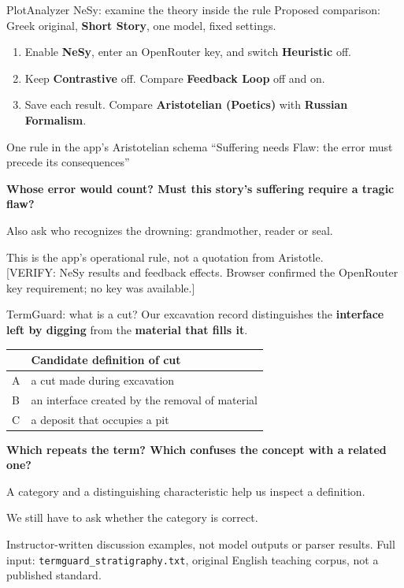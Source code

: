 \documentclass[aspectratio=169,10pt]{beamer}
\newcommand{\key}[1]{\textcolor{aegean}{\textbf{#1}}}
\newcommand{\source}[1]{\vfill{\scriptsize\color{slate}#1\par}}
\newcommand{\question}[1]{\medskip\par\key{#1}\par}
\begin{document}
\begin{frame}{PlotAnalyzer NeSy: examine the theory inside the rule}
  \small Proposed comparison: Greek original, \textbf{Short Story}, one model, fixed settings.
  \begin{enumerate}
    \item Enable \textbf{NeSy}, enter an OpenRouter key, and switch \textbf{Heuristic} off.
    \item Keep \textbf{Contrastive} off. Compare \textbf{Feedback Loop} off and on.
    \item Save each result. Compare \textbf{Aristotelian (Poetics)} with \textbf{Russian Formalism}.
  \end{enumerate}
  \begin{block}{One rule in the app's Aristotelian schema}
    “Suffering needs Flaw: the error must precede its consequences”
  \end{block}
  \question{Whose error would count? Must this story's suffering require a tragic flaw?}
  \small Also ask who recognizes the drowning: grandmother, reader or seal.
  \source{This is the app's operational rule, not a quotation from Aristotle.\\
  {}[VERIFY: NeSy results and feedback effects. Browser confirmed the OpenRouter key requirement; no key was available.]}
\end{frame}

\begin{frame}{TermGuard: what is a cut?}
  \small
  Our excavation record distinguishes the \key{interface left by digging} from the \key{material that fills it}.
  \par\medskip
  \begin{tabularx}{\textwidth}{@{}lX@{}}
    \toprule
    & \textbf{Candidate definition of cut}\\
    \midrule
    A & a cut made during excavation\\[7pt]
    B & an interface created by the removal of material\\[7pt]
    C & a deposit that occupies a pit\\
    \bottomrule
  \end{tabularx}
  \question{Which repeats the term? Which confuses the concept with a related one?}
  A category and a distinguishing characteristic help us inspect a definition.\par
  We still have to ask whether the category is correct.
  \source{Instructor-written discussion examples, not model outputs or parser results.\newline
  Full input: \texttt{termguard\_stratigraphy.txt}, original English teaching corpus, not a published standard.}
\end{frame}
\end{document}
